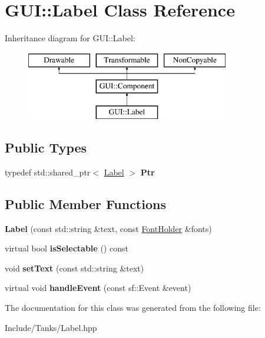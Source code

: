 \hypertarget{class_g_u_i_1_1_label}{}\section{G\+U\+I\+:\+:Label Class Reference}
\label{class_g_u_i_1_1_label}
Inheritance diagram for G\+U\+I\+:\+:Label\+:\begin{figure}[H]
\begin{center}
\leavevmode
\includegraphics[height=3.000000cm]{class_g_u_i_1_1_label}
\end{center}
\end{figure}
\subsection*{Public Types}
\begin{DoxyCompactItemize}
\item 
\hypertarget{class_g_u_i_1_1_label_aa00f786f8578a677ef7b979aa28c2546}{}typedef std\+::shared\+\_\+ptr$<$ \hyperlink{class_g_u_i_1_1_label}{Label} $>$ {\bfseries Ptr}\label{class_g_u_i_1_1_label_aa00f786f8578a677ef7b979aa28c2546}

\end{DoxyCompactItemize}
\subsection*{Public Member Functions}
\begin{DoxyCompactItemize}
\item 
\hypertarget{class_g_u_i_1_1_label_af7776f7b27736bf53a41b8aec79a60c5}{}{\bfseries Label} (const std\+::string \&text, const \hyperlink{class_resource_holder}{Font\+Holder} \&fonts)\label{class_g_u_i_1_1_label_af7776f7b27736bf53a41b8aec79a60c5}

\item 
\hypertarget{class_g_u_i_1_1_label_afa6abd1c4f2bb812e8fdf426be4c90fa}{}virtual bool {\bfseries is\+Selectable} () const \label{class_g_u_i_1_1_label_afa6abd1c4f2bb812e8fdf426be4c90fa}

\item 
\hypertarget{class_g_u_i_1_1_label_ab86467acdbe18a9fda4712a177e16dae}{}void {\bfseries set\+Text} (const std\+::string \&text)\label{class_g_u_i_1_1_label_ab86467acdbe18a9fda4712a177e16dae}

\item 
\hypertarget{class_g_u_i_1_1_label_a69d78318d537190aebbba1ab07363367}{}virtual void {\bfseries handle\+Event} (const sf\+::\+Event \&event)\label{class_g_u_i_1_1_label_a69d78318d537190aebbba1ab07363367}

\end{DoxyCompactItemize}


The documentation for this class was generated from the following file\+:\begin{DoxyCompactItemize}
\item 
Include/\+Tanks/Label.\+hpp\end{DoxyCompactItemize}
